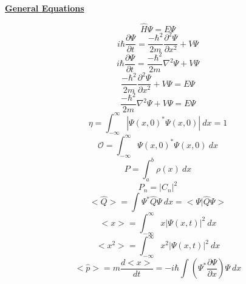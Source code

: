 \documentclass[10pt]{article}
\begin{document}
\begin{center}
\underline{\textbf{General Equations}}
\end{center}
\begin{multicols}{3}
\begin{equation*}
\hat{H}\Psi=E\Psi
\end{equation*}
\begin{equation*}
i\hbar\frac{\partial \Psi}{\partial t}=\frac{-\hbar^2}{2m}\frac{\partial^2\Psi}{\partial x^2}+V\Psi
\end{equation*}
\begin{equation*}
i\hbar\frac{\partial \Psi}{\partial t}=\frac{-\hbar^2}{2m}\nabla^2\Psi+V\Psi
\end{equation*}
\begin{equation*}
\frac{-\hbar^2}{2m}\frac{\partial^2\Psi}{\partial x^2}+V\Psi=E\Psi
\end{equation*}
\begin{equation*}
\frac{-\hbar^2}{2m}\nabla^2\Psi+V\Psi=E\Psi
\end{equation*}
\begin{equation*}
\eta=\int_{-\infty}^{\infty} |\Psi(x,0)^{*}\Psi(x,0)|  \ dx=1
\end{equation*}
\begin{equation*}
\mathcal{O}=\int_{-\infty}^{\infty}\Psi(x,0)^*\Psi(x,0) \ dx
\end{equation*}
\begin{equation*}
P=\int_{a}^{b}\rho (x)  \ dx
\end{equation*}
\begin{equation*}
P_n=|C_n|^2
\end{equation*}
\begin{equation*}
<\hat{Q}>=\int \Psi^{*}\hat{Q}\Psi  \ dx=<\Psi|\hat{Q}\Psi>
\end{equation*}
\begin{equation*}
<x>=\int_{-\infty}^{\infty}x|\Psi(x,t)|^2 \ dx
\end{equation*}
\begin{equation*}
<x^2>=\int_{-\infty}^{\infty}x^2|\Psi(x,t)|^2 \ dx
\end{equation*}
\begin{equation*}
<\hat{p}>=m\frac{d<x>}{dt}=-i\hbar \int \left(\Psi^{*}\frac{\partial \Psi}{\partial x}\right)\Psi \ dx
\end{equation*}
\begin{equation*}

\end{equation*}
\end{multicols}
\end{document}
